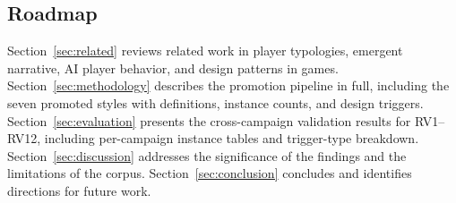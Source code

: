 \subsection{Roadmap}

Section~\ref{sec:related} reviews related work in player typologies, emergent narrative,
AI player behavior, and design patterns in games. Section~\ref{sec:methodology} describes
the promotion pipeline in full, including the seven promoted styles with definitions,
instance counts, and design triggers. Section~\ref{sec:evaluation} presents the
cross-campaign validation results for RV1--RV12, including per-campaign instance tables
and trigger-type breakdown. Section~\ref{sec:discussion} addresses the significance
of the findings and the limitations of the corpus. Section~\ref{sec:conclusion}
concludes and identifies directions for future work.

